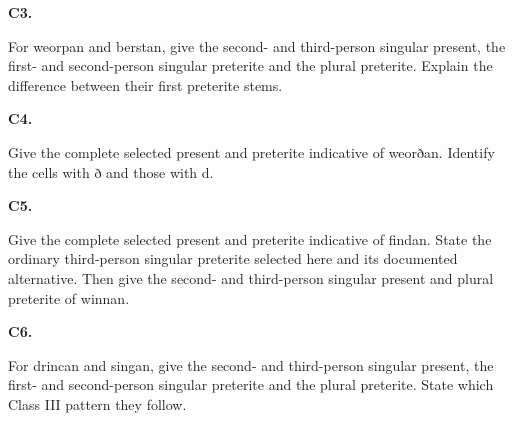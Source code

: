 \par\begin{minipage}{\linewidth}\raggedright
\textbf{C3.}

For weorpan and berstan, give the second- and third-person singular present, the first- and second-person singular preterite and the plural preterite. Explain the difference between their first preterite stems.

\end{minipage}\par\addvspace{4pt}

\par\begin{minipage}{\linewidth}\raggedright
\textbf{C4.}

Give the complete selected present and preterite indicative of weorðan. Identify the cells with ð and those with d.

\end{minipage}\par\addvspace{4pt}

\par\begin{minipage}{\linewidth}\raggedright
\textbf{C5.}

Give the complete selected present and preterite indicative of findan. State the ordinary third-person singular preterite selected here and its documented alternative. Then give the second- and third-person singular present and plural preterite of winnan.

\end{minipage}\par\addvspace{4pt}

\par\begin{minipage}{\linewidth}\raggedright
\textbf{C6.}

For drincan and singan, give the second- and third-person singular present, the first- and second-person singular preterite and the plural preterite. State which Class III pattern they follow.

\end{minipage}\par\addvspace{4pt}


